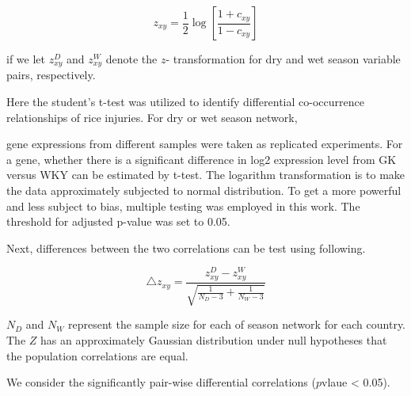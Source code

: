 \begin{equation}
z_{xy} = \frac{1}{2} \log\left[{\frac{1 + c_{xy}}{1 - c_{xy}}}\right]
\end{equation}

if we let $z_{xy}^D $ and $z_{xy}^W$ denote the $z$- transformation for dry and wet season variable pairs, respectively. 

Here the student's t-test was utilized to identify differential co-occurrence relationships of rice injuries. For dry or wet season network, 

gene expressions from different samples were taken as replicated experiments. For a gene, whether there is a significant difference in log2 expression level from GK versus WKY can be estimated by t-test. The logarithm transformation is to make the data approximately subjected to normal distribution. To get a more powerful and less subject to bias, multiple testing was employed in this work. The threshold for adjusted p-value was set to 0.05.

Next, differences between the two correlations can be test using following. 

\begin{equation}
\triangle z_{xy} = \frac{z_{xy}^D - z_{xy}^W}{\sqrt{\frac{1}{N_{D}-3}+ \frac{1}{N_{W}-3}}}
\end{equation}

$N_{D}$ and $N_{W}$ represent the sample size for each of season network for each country. The $Z$ has an approximately Gaussian distribution under null hypotheses that the population correlations are equal.

We consider the significantly pair-wise differential correlations ($p$vlaue < 0.05).


 

